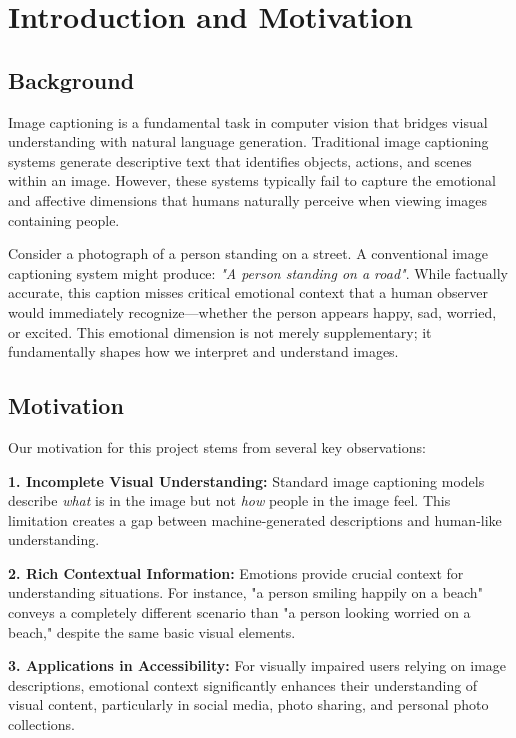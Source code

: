 \documentclass[12pt]{article}
\begin{document}
\clearpage
\tableofcontents
\clearpage

\section{Introduction and Motivation}

\subsection{Background}
Image captioning is a fundamental task in computer vision that bridges visual understanding with natural language generation. Traditional image captioning systems generate descriptive text that identifies objects, actions, and scenes within an image. However, these systems typically fail to capture the emotional and affective dimensions that humans naturally perceive when viewing images containing people.

Consider a photograph of a person standing on a street. A conventional image captioning system might produce: \textit{"A person standing on a road"}. While factually accurate, this caption misses critical emotional context that a human observer would immediately recognize—whether the person appears happy, sad, worried, or excited. This emotional dimension is not merely supplementary; it fundamentally shapes how we interpret and understand images.

\subsection{Motivation}
Our motivation for this project stems from several key observations:

\textbf{1. Incomplete Visual Understanding:} Standard image captioning models describe \textit{what} is in the image but not \textit{how} people in the image feel. This limitation creates a gap between machine-generated descriptions and human-like understanding.

\textbf{2. Rich Contextual Information:} Emotions provide crucial context for understanding situations. For instance, "a person smiling happily on a beach" conveys a completely different scenario than "a person looking worried on a beach," despite the same basic visual elements.

\textbf{3. Applications in Accessibility:} For visually impaired users relying on image descriptions, emotional context significantly enhances their understanding of visual content, particularly in social media, photo sharing, and personal photo collections.
\end{document}
